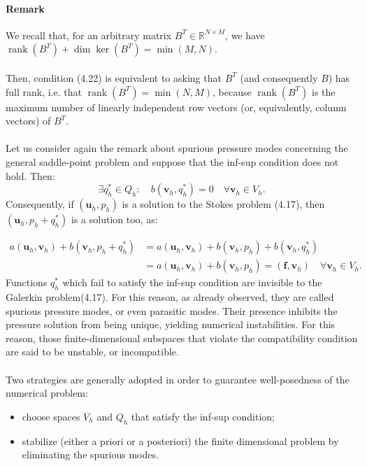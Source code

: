 \documentclass[11pt]{book}
\begin{document}
\paragraph{Remark}
We recall that, for an arbitrary matrix $B^{T} \in \mathbb{R}^{N \times M}$, we have $\operatorname{rank}\left(B^{T}\right)+\operatorname{dim} \operatorname{ker}\left(B^{T}\right)=\min (M, N)$. \\ \\
Then, condition (4.22) is equivalent to asking that $B^{T}$ (and consequently $B$) has full rank, i.e. that $\operatorname{rank}\left(B^{T}\right)=\min (N, M)$, because $\operatorname{rank}\left(B^{T}\right)$ is the maximum number of linearly independent row vectors (or, equivalently, column vectors) of $B^{T}$. \\ \\
Let us consider again the remark about spurious pressure modes concerning the general saddle-point problem and suppose that the inf-sup condition does not hold. Then:
\begin{equation}
    \exists q_{h}^{*} \in Q_{h}: \quad b\left(\mathbf{v}_{h}, q_{h}^{*}\right)=0 \quad \forall \mathbf{v}_{h} \in V_{h} .
\end{equation}
Consequently, if $\left(\mathbf{u}_{h}, p_{h}\right)$ is a solution to the Stokes problem (4.17), then $\left(\mathbf{u}_{h}, p_{h}+q_{h}^{*}\right)$ is a solution too, as:

$$
\begin{aligned}
a\left(\mathbf{u}_{h}, \mathbf{v}_{h}\right)+b\left(\mathbf{v}_{h}, p_{h}+q_{h}^{*}\right) & =a\left(\mathbf{u}_{h}, \mathbf{v}_{h}\right)+b\left(\mathbf{v}_{h}, p_{h}\right)+b\left(\mathbf{v}_{h}, q_{h}^{*}\right) \\
& =a\left(\mathbf{u}_{h}, \mathbf{v}_{h}\right)+b\left(\mathbf{v}_{h}, p_{h}\right)=\left(\mathbf{f}, \mathbf{v}_{h}\right) \quad \forall \mathbf{v}_{h} \in V_{h} .
\end{aligned}
$$
Functions $q_{h}^{*}$ which fail to satisfy the inf-sup condition are invisible to the Galerkin problem(4.17). For this reason, as already observed, they are called spurious pressure modes, or even parasitic modes. Their presence inhibits the pressure solution from being unique, yielding numerical instabilities. For this reason, those finite-dimensional subspaces that violate the compatibility condition are said to be unstable, or incompatible.\\ \\
Two strategies are generally adopted in order to guarantee well-posedness of the numerical problem:
\begin{itemize}
  \item choose spaces $V_{h}$ and $Q_{h}$ that satisfy the inf-sup condition;
  \item stabilize (either a priori or a posteriori) the finite dimensional problem by eliminating the spurious modes.
\end{itemize}
\end{document}
